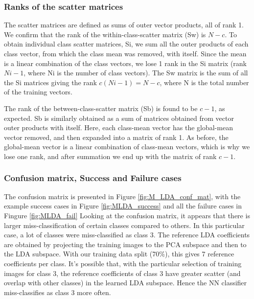 \documentclass[10pt,technote]{IEEEtran}
\begin{document}
\subsubsection{Ranks of the scatter matrices}
The scatter matrices are defined as sums of outer vector products, all of rank 1.
We confirm that the rank of the within-class-scatter matrix (Sw) is $N - c$. To obtain individual class scatter matrices, Si, we sum all the outer products of each class vector, from which the class mean was removed, with itself. Since the mean is a linear combination of the class vectors, we lose 1 rank in the Si matrix (rank $Ni - 1$, where Ni is the number of class vectors). The Sw matrix is the sum of all the Si matrices giving the rank $c(Ni - 1) = N - c$, where N is the total number of the training vectors.

The rank of the between-class-scatter matrix (Sb) is found to be $c - 1$, as expected. Sb is similarly obtained as a sum of matrices obtained from vector outer products with itself. Here, each class-mean vector has the global-mean vector removed, and then expanded into a matrix of rank 1. As before, the global-mean vector is a linear combination of class-mean vectors, which is why we lose one rank, and after summation we end up with the matrix of rank $c - 1$.

\subsubsection{Confusion matrix, Success and Failure cases}
The confusion matrix is presented in Figure \ref{fig:M_LDA_conf_mat}, with the example success cases in Figure \ref{fig:MLDA_success} and all the failure cases in Fingure \ref{fig:MLDA_fail}
Looking at the confusion matrix, it appears that there is larger miss-classification of certain classes compared to others. In this particular case, a lot of classes were miss-classified as class 3. The reference LDA coefficients are obtained by projecting the training images to the PCA subspace and then to the LDA subspace. With our training data split (70\%), this gives 7 reference coefficients per class. It's possible that, with the particular selection of training images for class 3, the reference coefficients of class 3 have greater scatter (and overlap with other classes) in the learned LDA subspace. Hence the NN classifier miss-classifies as class 3 more often.
\end{document}
